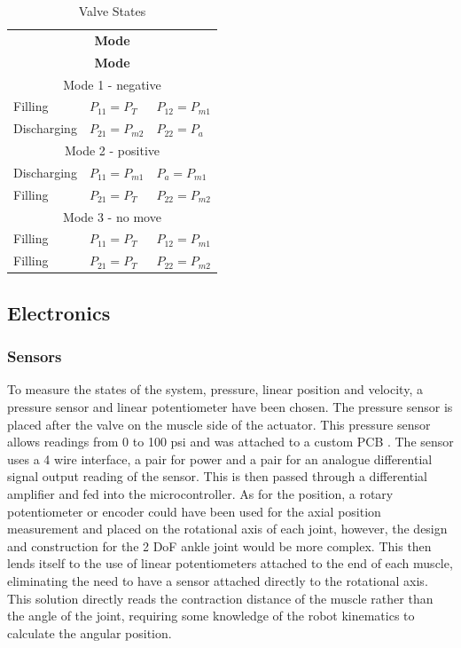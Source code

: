 \documentclass[11pt,a4paper]{article}
\begin{document}
\begin{table}[!hbt]
    \centering
    \caption{Valve States}
    \begin{tabular}{l l l}
        \multicolumn{3}{c}{\textbf{Mode}} \\
        \multicolumn{3}{c}{\textbf{Mode}} \\
        \hline
            \multicolumn{3}{c}{Mode 1 - negative}\\
        \hline   
            Filling & $P_{11} = P_{T}$ & $P_{12} = P_{m1}$\\
            Discharging & $P_{21} = P_{m2}$ & $P_{22} = P_{a}$\\
        \hline
            \multicolumn{3}{c}{Mode 2 - positive}\\
        \hline
            Discharging & $P_{11} = P_{m1}$ & $P_{a} = P_{m1}$ \\
            Filling & $P_{21} = P_{T}$ & $P_{22} = P_{m2}$ \\
        \hline
            \multicolumn{3}{c}{Mode 3 - no move}\\
        \hline    
            Filling & $P_{11} = P_{T}$ & $P_{12} = P_{m1}$\\
            Filling & $P_{21} = P_{T}$ & $P_{22} = P_{m2}$\\
        \hline
    \end{tabular}
    \label{tab:valve_states}
\end{table}

\subsection{Electronics}
\label{subsection:electronics}

\subsubsection{Sensors}
\label{sub:sensors}

To measure the states of the system, pressure, linear position and velocity, a pressure sensor and linear potentiometer have been chosen. The pressure sensor is placed after the valve on the muscle side of the actuator. This pressure sensor \cite{NBPLANN100PGUNV} allows readings from 0 to 100 psi and was attached to a custom PCB . The sensor uses a 4 wire interface, a pair for power and a pair for an analogue differential signal output reading of the sensor. This is then passed through a differential amplifier and fed into the microcontroller. As for the position, a rotary potentiometer or encoder could have been used for the axial position measurement and placed on the rotational axis of each joint, however, the design and construction for the 2 DoF ankle joint would be more complex. This then lends itself to the use of linear potentiometers attached to the end of each muscle, eliminating the need to have a sensor attached directly to the rotational axis. This solution directly reads the contraction distance of the muscle rather than the angle of the joint, requiring some knowledge of the robot kinematics to calculate the angular position.
\end{document}
